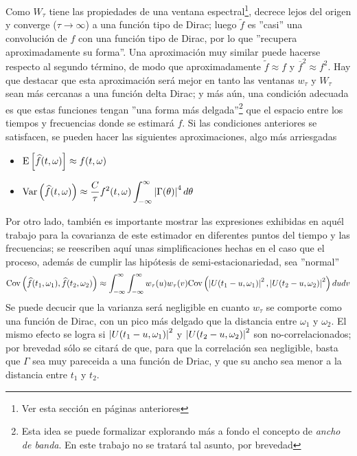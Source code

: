 Como $W_{\tau}$ tiene las propiedades de una ventana espectral\footnote{Ver esta secci\'on
en p\'aginas anteriores},
decrece lejos del origen y converge ($\tau \rightarrow \infty$) 
a una funci\'on tipo \ddd de Dirac;
luego $\widetilde{f}$ 
es ''casi'' una convoluci\'on de $f$ con una funci\'on tipo \ddd de Dirac, por
lo que ''recupera aproximadamente su forma''. Una aproximaci\'on muy similar puede hacerse
respecto al
segundo t\'ermino, de modo que aproximadamente $\widetilde{f}\approx f$ y 
$\overline{f}^{2}\approx f^{2}$. Hay que destacar que esta aproximaci\'on ser\'a mejor en 
tanto las ventanas $w_{\tau}$ y $W_{\tau}$ sean m\'as cercanas a una funci\'on delta Dirac; 
y m\'as a\'un, una condici\'on adecuada es que estas funciones tengan ''una forma m\'as 
delgada''\footnote{Esta idea se puede formalizar explorando m\'as a fondo el concepto de 
\textit{ancho de 
banda}.
En este trabajo no se tratar\'a tal asunto,
por brevedad}
que el espacio entre los tiempos y frecuencias donde se estimar\'a $f$.
Si las condiciones anteriores se satisfacen, se pueden hacer las siguientes aproximaciones, algo
m\'as arriesgadas
\begin{itemize}
\item $\displaystyle \mathrm{E}\left[ \widehat{ f }(t,\omega) \right] \approx f(t,\omega)$
\item $\displaystyle \mathrm{Var}\left( \widehat{ f }(t,\omega) \right) \approx 
\frac{C}{\tau} f^{2}(t,\omega) \int_{-\infty}^{\infty} \left| \Gamma (\theta) \right|^{4} d\theta$
\end{itemize}


Por otro lado, tambi\'en es importante mostrar las expresiones exhibidas en aqu\'el trabajo
para la covarianza de este estimador en diferentes puntos del tiempo y las frecuencias;
se reescriben aqu\'i unas simplificaciones hechas en el caso que el proceso, adem\'as de
cumplir las hip\'otesis de semi-estacionariedad, sea ''normal''
\begin{equation*}
\mathrm{Cov}\left( \widehat{ f }(t_1,\omega_1) , \widehat{ f }(t_2,\omega_2) \right) \approx \int_{-\infty}^{\infty} \int_{-\infty}^{\infty}
w_\tau (u) w_\tau(v) \mathrm{Cov}\left(  \left| U(t_1-u,\omega_1) \right|^{2} , \left| U(t_2-u,\omega_2) \right|^{2}  \right)
du dv
\end{equation*}
Se puede decucir que la varianza ser\'a negligible en cuanto $w_\tau$ se comporte como una
funci\'on \ddd de Dirac, con un pico m\'as delgado que la distancia entre $\omega_1$ y $\omega_2$.
El mismo efecto se logra si $\left| U(t_1-u,\omega_1) \right|^{2}$ y $\left| U(t_2-u,\omega_2) \right|^{2}$
son no-correlacionados; por brevedad s\'olo se citar\'a de \cite{Priestley65} que, para que la
correlaci\'on sea negligible, basta que $\Gamma$ sea muy pareceida a una funci\'on \ddd
de Driac, y que su ancho sea menor a la distancia entre $t_1$ y $t_2$.

